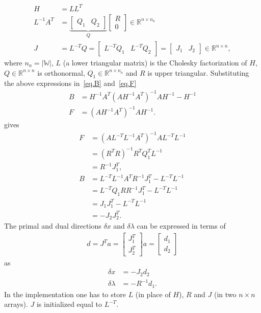 \documentclass[12pt,a4paper]{article}
\begin{document}
\begin{align}
  H &= LL^T \\
  L^{-1}A^T &=
  \underbrace{\begin{bmatrix}
    Q_1 & Q_2
  \end{bmatrix}}_{Q}
  \begin{bmatrix}
    R \\ 0
  \end{bmatrix}  \in \mathbb{R}^{n \times n_a} \\
  J &= L^{-T}Q =
  \begin{bmatrix}
    L^{-T}Q_1 & L^{-T}Q_2
  \end{bmatrix} =
  \begin{bmatrix}
    J_1 & J_2
  \end{bmatrix} \in \mathbb{R}^{n \times n},
\end{align}
%
where $n_a = |\mathbb{W}|$, $L$ (a lower triangular matrix) is the Cholesky
factorization of $H$, $Q \in \mathbb{R}^{n \times n}$ is orthonormal, $Q_1 \in
\mathbb{R}^{n \times n_a}$ and $R$ is upper triangular. Substituting the above
expressions in~\eqref{eq.B} and~\eqref{eq.F}
%
\begin{align*}
  B &= H^{-1}A^T(AH^{-1}A^T)^{-1}AH^{-1} - H^{-1}\\
  F &= (AH^{-1}A^T)^{-1}AH^{-1}.
\end{align*}
%
gives
%
\begin{align*}
  F &= (AL^{-T}L^{-1}A^T)^{-1}AL^{-T}L^{-1} \\
    &= (R^TR)^{-1}R^TQ_1^TL^{-1} \\
    &= R^{-1}J_1^T, \\[0.2cm]
%
  B &= L^{-T}L^{-1}A^TR^{-1}J_1^T - L^{-T}L^{-1} \\
    &= L^{-T}Q_1RR^{-1}J_1^T - L^{-T}L^{-1} \\
    &= J_1J_1^T - L^{-T}L^{-1} \\
    &= -J_2J_2^T.
\end{align*}
%
The primal and dual directions $\delta x$ and $\delta \lambda$ can be expressed
in terms of
%
\begin{align}
  d = J^Ta =
  \begin{bmatrix}
    J_1^T \\ J_2^T
  \end{bmatrix}a =
  \begin{bmatrix}
    d_1 \\ d_2
  \end{bmatrix}
\end{align}
%
as
%
\begin{align}
  \delta x &= -J_2d_2 \\
  \delta \lambda &= -R^{-1}d_1.
\end{align}
%
In the implementation one has to store $L$ (in place of $H$), $R$ and $J$ (in
two $n \times n$ arrays). $J$ is initialized equal to $L^{-T}$.
\end{document}
